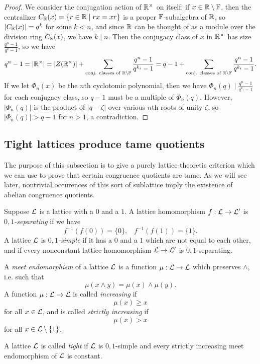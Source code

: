 \begin{appendices}
\begin{proof}
We consider the conjugation action of $\mathbb{R}^\times$ on itself: if $x \in \mathbb{R} \setminus \mathbb{F}$, then the centralizer $C_{\mathbb{R}}(x) = \{r \in \mathbb{R} \mid rx = xr\}$ is a proper $\mathbb{F}$-subalgebra of $\mathbb{R}$, so $|C_{\mathbb{R}}(x)| = q^k$ for some $k < n$, and since $\mathbb{R}$ can be thought of as a module over the division ring $C_{\mathbb{R}}(x)$, we have $k \mid n$. Then the conjugacy class of $x$ in $\mathbb{R}^\times$ has size $\frac{q^n-1}{q^k-1}$, so we have
\[
q^n-1 = |\mathbb{R}^\times| = |Z(\mathbb{R}^\times)| + \sum_{\text{conj. classes of }\mathbb{R}\setminus\mathbb{F}} \frac{q^n-1}{q^{k_i}-1} = q-1 + \sum_{\text{conj. classes of }\mathbb{R}\setminus\mathbb{F}} \frac{q^n-1}{q^{k_i}-1}.
\]
If we let $\Phi_n(x)$ be the $n$th cyclotomic polynomial, then we have $\Phi_n(q) \mid \frac{q^n-1}{q^{k_i}-1}$ for each conjugacy class, so $q-1$ must be a multiple of $\Phi_n(q)$. However, $|\Phi_n(q)|$ is the product of $|q-\zeta|$ over various $n$th roots of unity $\zeta$, so $|\Phi_n(q)| > q-1$ for $n > 1$, a contradiction.
\end{proof}


\subsection{Tight lattices produce tame quotients}

The purpose of this subsection is to give a purely lattice-theoretic criterion which we can use to prove that certain congruence quotients are tame. As we will see later, nontrivial occurences of this sort of sublattice imply the existence of abelian congruence quotients.

\begin{defn} Suppose $\mathcal{L}$ is a lattice with a $0$ and a $1$. A lattice homomorphism $f : \mathcal{L} \rightarrow \mathcal{L}'$ is \emph{$0,1$-separating} if we have
\[
f^{-1}(f(0)) = \{0\}, \;\;\; f^{-1}(f(1)) = \{1\}.
\]
A lattice $\mathcal{L}$ is \emph{$0,1$-simple} if it has a $0$ and a $1$ which are not equal to each other, and if every nonconstant lattice homomorphism $\mathcal{L} \rightarrow \mathcal{L}'$ is $0,1$-separating.

A \emph{meet endomorphism} of a lattice $\mathcal{L}$ is a function $\mu : \mathcal{L} \rightarrow \mathcal{L}$ which preserves $\wedge$, i.e. such that
\[
\mu(x \wedge y) = \mu(x) \wedge \mu(y).
\]
A function $\mu : \mathcal{L} \rightarrow \mathcal{L}$ is called \emph{increasing} if
\[
\mu(x) \ge x
\]
for all $x \in \mathcal{L}$, and is called \emph{strictly increasing} if
\[
\mu(x) > x
\]
for all $x \in \mathcal{L} \setminus \{1\}$.

A lattice $\mathcal{L}$ is called \emph{tight} if $\mathcal{L}$ is $0,1$-simple and every strictly increasing meet endomorphism of $\mathcal{L}$ is constant.
\end{defn}


\end{appendices}
